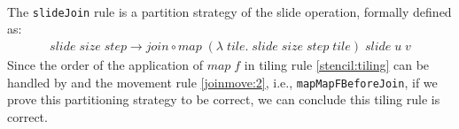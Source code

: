 \documentclass{l4proj}
\begin{document}
\begin{code}
\AgdaSpace{}%
\AgdaOperator{\AgdaPrimitive{+}}\AgdaSpace{}%
\AgdaSpace{}%
\AgdaOperator{\AgdaPrimitive{*}}\AgdaSpace{}%
\AgdaSymbol{))}\AgdaSpace{}%
\AgdaSymbol{(}\AgdaSpace{}%
\AgdaSymbol{\AgdaUnderscore{}}\AgdaSpace{}%
\AgdaSymbol{)))}\<%
\\
%
\>[2]%
\>[649I]\AgdaSpace{}%
\AgdaSymbol{(}\AgdaSpace{}%
\AgdaSpace{}%
\AgdaSymbol{(}\AgdaSpace{}%
\AgdaSpace{}%
\AgdaSpace{}%
\AgdaSymbol{(}\AgdaSpace{}%
\AgdaSymbol{(}\AgdaSpace{}%
\AgdaOperator{\AgdaPrimitive{+}}\AgdaSpace{}%
\AgdaSpace{}%
\AgdaOperator{\AgdaPrimitive{*}}\AgdaSpace{}%
\AgdaSpace{}%
\AgdaSymbol{)}\AgdaSpace{}%
\AgdaSymbol{))}\AgdaSpace{}%
\AgdaSymbol{)}\<%
\\
\>[.][@{}l@{}]\<[649I]%
\>[5]\AgdaSymbol{(}\AgdaSpace{}%
\AgdaSpace{}%
\AgdaSpace{}%
\AgdaSpace{}%
\AgdaSymbol{(}\AgdaSpace{}%
\AgdaSymbol{(}\AgdaSpace{}%
\AgdaSymbol{(}\AgdaSpace{}%
\AgdaOperator{\AgdaPrimitive{+}}\AgdaSpace{}%
\AgdaSpace{}%
\AgdaOperator{\AgdaPrimitive{+}}\AgdaSpace{}%
\AgdaSpace{}%
\AgdaOperator{\AgdaPrimitive{*}}\AgdaSpace{}%
\AgdaSymbol{))}\AgdaSpace{}%
\AgdaSymbol{(}\AgdaSpace{}%
\AgdaSymbol{\AgdaUnderscore{}}\AgdaSpace{}%
\AgdaSymbol{)))}\AgdaSpace{}%
\<%
\\
\>[2][@{}l@{\AgdaIndent{0}}]%
\>[4]\<%
\end{code}

The \texttt{slideJoin} rule is a partition strategy of the slide operation, formally defined as:
\begin{align}
    \label{stencil:slide-join}
    slide\; size\; step \to join \circ map\; (\lambda\; tile.\; slide\; size\; step\; tile)\; slide\; u\; v 
\end{align}
Since the order of the application of $map\; f$ in tiling rule \ref{stencil:tiling} can be handled by  and the movement rule \ref{joinmove:2}, i.e., \texttt{mapMapFBeforeJoin}, if we prove this partitioning strategy to be correct, we can conclude this tiling rule is correct.
\end{document}
